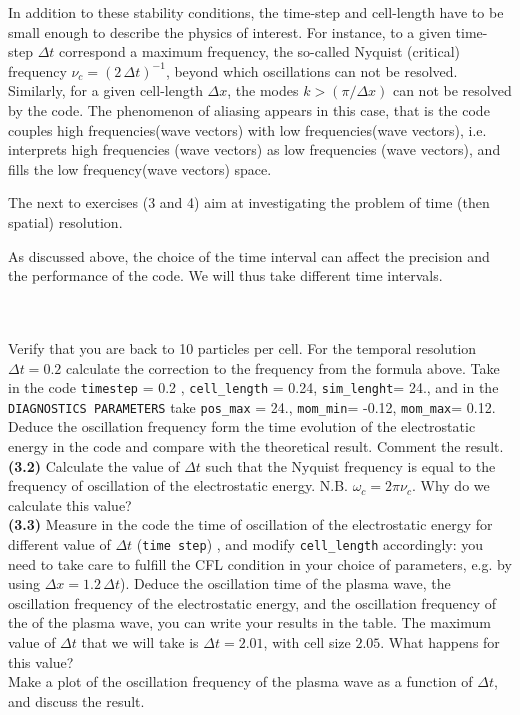 \documentclass[10pt]{article}
\begin{document}
In addition to these stability conditions, the time-step and cell-length have to be small enough to describe the physics of interest. For instance, to a given time-step $\Delta t$ correspond a maximum frequency, the so-called Nyquist (critical) frequency $\nu_c =(2\,\Delta t)^{-1}$, beyond which oscillations can not be resolved. Similarly, for a given cell-length $\Delta x$, the modes $k>(\pi/\Delta x)$ can not be resolved by the code.  The phenomenon of aliasing appears in this case, that is the code couples high frequencies(wave vectors)  with low frequencies(wave vectors), i.e. interprets high frequencies (wave vectors) as low frequencies (wave vectors), and fills the low frequency(wave vectors) space. 

The next to exercises (3 and 4) aim at investigating the problem of time (then spatial) resolution. 

As discussed above, the choice of the time interval can affect the precision and the performance of the code. We will thus take different time intervals. 

$ $\\
\\
 Verify that you are back to 10 particles per cell. For the temporal resolution $\Delta t = 0.2$ calculate the correction to the frequency from the formula above.  Take in the code \texttt{timestep} = 0.2 , \texttt{cell\_length} = 0.24, \texttt{sim\_lenght}= 24., and in the \texttt{DIAGNOSTICS PARAMETERS} take   \texttt{pos\_max} = 24., \texttt{mom\_min}= -0.12, \texttt{mom\_max}= 0.12.   Deduce the oscillation frequency form the time evolution of the electrostatic energy in the code and compare with the theoretical result. Comment the result. \\
{\bf (3.2)} Calculate the value of $\Delta t $ such that the Nyquist frequency is equal to the frequency of oscillation of the electrostatic energy. N.B. $\omega_c = 2 \pi \nu_c$. Why do we calculate this value? \\
{\bf (3.3)} Measure in the code  the time of oscillation of the electrostatic energy for different value of $\Delta t$ (\texttt{time step}) , and modify \texttt{cell\_length} accordingly: you need to take care to fulfill the CFL condition in your choice of parameters, e.g. by using $\Delta x = 1.2\,\Delta t$). Deduce the oscillation time of the plasma wave, the oscillation frequency of the electrostatic energy, and the oscillation frequency of the of the plasma wave, you can write your results in the table. The maximum value of $\Delta t $ that we will take is $\Delta t = 2.01$, with cell size $2.05$. What happens for this value? \\
 Make a plot of the oscillation frequency of the plasma wave as a function of $\Delta t$, and discuss the result. \\
\end{document}
